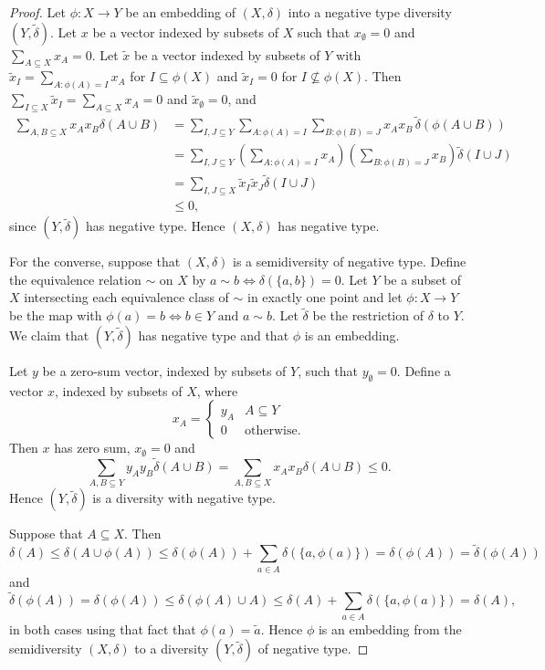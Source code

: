 \documentclass[11pt]{article}
\newcommand{\td}{\widetilde{\delta}}
\begin{document}
\begin{proof}
Let $\phi:X \rightarrow Y$ be an embedding of $(X,\delta)$ into a negative type diversity $(Y,\td)$. 
Let $x$ be a vector indexed by subsets of $X$ such that $x_\emptyset = 0$ and $\sum_{A \subseteq X} x_A = 0$. Let $\tilde{x}$ be a vector indexed by subsets of $Y$ with $\tilde{x}_I = \sum_{A:\phi(A) = I} x_A$ for $I \subseteq \phi(X)$ and  $\tilde{x}_I = 0$ for $I \not \subseteq \phi(X)$. Then $\sum_{I \subseteq X} \tilde{x}_I = \sum_{A \subseteq X} x_A = 0$ and $\tilde{x}_\emptyset = 0$, and
    \begin{align*}
        \sum_{A,B \subseteq X} x_A x_B \delta(A \cup B) & = \sum_{I,J \subseteq Y} \sum_{A:\phi(A) = I} \sum_{B:\phi(B) = J} x_A x_B 
        \, \td(\phi(A \cup B)) \\
        & = \sum_{I,J \subseteq Y} \left(\sum_{A : \phi(A) = I} x_A \right) \left(\sum_{B : \phi(B) = J} x_B \right) \td(I \cup J) \\
        & =  \sum_{I,J \subseteq X} \tilde{x}_I \tilde{x}_J \td(I \cup J)  \\
        & \leq 0,
    \end{align*}
    since  $(Y,\td)$ has negative type. Hence $(X,\delta)$ has negative type.
    
  For the converse, suppose that $(X,\delta)$ is a semidiversity of negative type. Define the equivalence relation $\sim$ on $X$ by $a \sim b \Leftrightarrow \delta(\{a,b\})=0$. Let $Y$ be a subset of $X$ intersecting each equivalence class of $\sim$ in exactly one point and let $\phi:X \rightarrow Y$ be the map with $\phi(a) = b \Leftrightarrow b \in Y \mbox{ and }a \sim b$. Let $\td$ be the restriction of $\delta$ to $Y$. We claim that $(Y,\td)$ has negative type and that $\phi$ is an embedding. 
 
Let $y$ be a zero-sum vector, indexed by subsets of $Y$, such that $y_\emptyset = 0$. Define a vector $x$, indexed by subsets of $X$, where
\[x_A = \begin{cases} y_A & A \subseteq Y \\ 0 & \mbox{otherwise.} \end{cases}\]
Then $x$ has zero sum, $x_\emptyset = 0$ and 
\[\sum_{A,B \subseteq Y} y_A y_B \td(A \cup B) = \sum_{A,B \subseteq X} x_A x_B \delta(A \cup B) \leq 0.\]
Hence $(Y,\td)$ is a diversity with negative type.

Suppose that $A \subseteq X$. Then 
\[\delta(A) \leq \delta(A \cup \phi(A)) \leq \delta(\phi(A)) + \sum_{a \in A} \delta(\{a,\phi(a)\}) = \delta(\phi(A)) = \td(\phi(A))\]
and 
\[\td(\phi(A)) = \delta(\phi(A)) \leq \delta(\phi(A) \cup A) \leq \delta(A) + \sum_{a \in A} \delta(\{a,\phi(a)\}) = \delta(A),\]
in both cases using that fact that $\phi(a) =\tilde a$. Hence $\phi$ is an embedding from the semidiversity $(X,\delta)$ to a diversity $(Y,\td)$ of negative type.
\end{proof}
\end{document}

